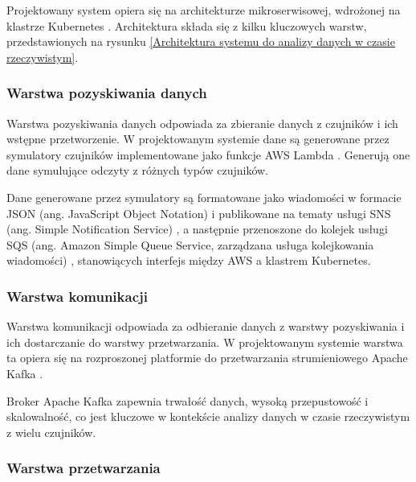 Projektowany system opiera się na architekturze mikroserwisowej, wdrożonej na klastrze Kubernetes \cite{kubernetes_benefits}.
Architektura składa się z kilku kluczowych warstw, przedstawionych na rysunku \ref{Architektura systemu do analizy danych w czasie rzeczywistym}.



\newpage

\subsubsection{Warstwa pozyskiwania danych}
\label{subsubsec:warstwa_pozyskiwania}

Warstwa pozyskiwania danych odpowiada za zbieranie danych z czujników i ich wstępne przetworzenie.
W projektowanym systemie dane są generowane przez symulatory czujników implementowane jako funkcje AWS Lambda \cite{aws_lambda_docs}.
Generują one dane symulujące odczyty z różnych typów czujników.

Dane generowane przez symulatory są formatowane jako wiadomości w formacie JSON (ang. JavaScript Object Notation) \cite{json_schema_org} i publikowane na tematy usługi SNS (ang. Simple Notification Service) \cite{sns_docs}, a następnie przenoszone do kolejek usługi SQS (ang. Amazon Simple Queue Service, zarządzana usługa kolejkowania wiadomości) \cite{sqs_docs}, stanowiących interfejs między AWS a klastrem Kubernetes.

\subsubsection{Warstwa komunikacji}
\label{subsubsec:warstwa_komunikacji}

Warstwa komunikacji odpowiada za odbieranie danych z warstwy pozyskiwania i ich dostarczanie do warstwy przetwarzania.
W projektowanym systemie warstwa ta opiera się na rozproszonej platformie do przetwarzania strumieniowego Apache Kafka \cite{kafka}.


Broker Apache Kafka zapewnia trwałość danych, wysoką przepustowość i skalowalność, co jest kluczowe w kontekście analizy danych w czasie rzeczywistym z wielu czujników.

\subsubsection{Warstwa przetwarzania}
\label{subsubsec:warstwa_przetwarzania}

